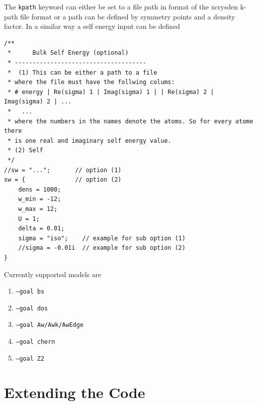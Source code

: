 \documentclass[a4paper,11pt]{report}
\begin{document}
The \texttt{kpath} keyword can either be set to a file path in format of the xcrysden k-path
file format or a path can be defined by symmetry points and a density factor. In a similar way
a self energy input can be defined
\begin{lstlisting}[frame=single] 
/**
 *      Bulk Self Energy (optional)
 * -------------------------------------
 *  (1) This can be either a path to a file
 * where the file must have the follwing colums:
 * # energy | Re(sigma) 1 | Imag(sigma) 1 | | Re(sigma) 2 | Imag(sigma) 2 | ...
 *   ...
 * where the numbers in the names denote the atoms. So for every atome there
 * is one real and imaginary self energy value.
 * (2) Self
 */
//sw = "...";       // option (1)
sw = {              // option (2)
    dens = 1000;
    w_min = -12;
    w_max = 12;
    U = 1;
    delta = 0.01;
    sigma = "iso";    // example for sub option (1)
    //sigma = -0.01i  // example for sub option (2)
}
\end{lstlisting}
Currently supported models are 
\begin{enumerate}
 \item {} \texttt{--goal bs}
 \item {} \texttt{--goal dos}
 \item {} \texttt{--goal Aw/Awk/AwEdge}
 \item {} \texttt{--goal chern}
 \item {} \texttt{--goal Z2}
\end{enumerate}


\subsection{}



\section{Extending the Code}

\printbibliography
\end{document}
